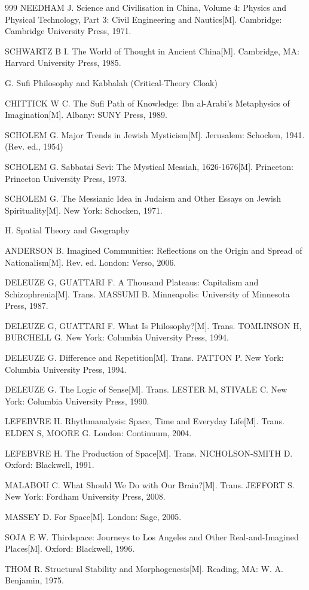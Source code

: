 \begin{thebibliography}{999}
\bibitem{} NEEDHAM J. Science and Civilisation in China, Volume 4: Physics and Physical Technology, Part 3: Civil Engineering and Nautics[M]. Cambridge: Cambridge University Press, 1971.

\bibitem{} SCHWARTZ B I. The World of Thought in Ancient China[M]. Cambridge, MA: Harvard University Press, 1985.

\bibitem{} G. Sufi Philosophy and Kabbalah (Critical-Theory Cloak)

\bibitem{} CHITTICK W C. The Sufi Path of Knowledge: Ibn al-Arabi’s Metaphysics of Imagination[M]. Albany: SUNY Press, 1989.

\bibitem{} SCHOLEM G. Major Trends in Jewish Mysticism[M]. Jerusalem: Schocken, 1941. (Rev. ed., 1954)

\bibitem{} SCHOLEM G. Sabbatai Sevi: The Mystical Messiah, 1626-1676[M]. Princeton: Princeton University Press, 1973.

\bibitem{} SCHOLEM G. The Messianic Idea in Judaism and Other Essays on Jewish Spirituality[M]. New York: Schocken, 1971.

\bibitem{} H. Spatial Theory and Geography

\bibitem{} ANDERSON B. Imagined Communities: Reflections on the Origin and Spread of Nationalism[M]. Rev. ed. London: Verso, 2006.

\bibitem{} DELEUZE G, GUATTARI F. A Thousand Plateaus: Capitalism and Schizophrenia[M]. Trans. MASSUMI B. Minneapolis: University of Minnesota Press, 1987.

\bibitem{} DELEUZE G, GUATTARI F. What Is Philosophy?[M]. Trans. TOMLINSON H, BURCHELL G. New York: Columbia University Press, 1994.

\bibitem{} DELEUZE G. Difference and Repetition[M]. Trans. PATTON P. New York: Columbia University Press, 1994.

\bibitem{} DELEUZE G. The Logic of Sense[M]. Trans. LESTER M, STIVALE C. New York: Columbia University Press, 1990.

\bibitem{} LEFEBVRE H. Rhythmanalysis: Space, Time and Everyday Life[M]. Trans. ELDEN S, MOORE G. London: Continuum, 2004.

\bibitem{} LEFEBVRE H. The Production of Space[M]. Trans. NICHOLSON-SMITH D. Oxford: Blackwell, 1991.

\bibitem{} MALABOU C. What Should We Do with Our Brain?[M]. Trans. JEFFORT S. New York: Fordham University Press, 2008.

\bibitem{} MASSEY D. For Space[M]. London: Sage, 2005.

\bibitem{} SOJA E W. Thirdspace: Journeys to Los Angeles and Other Real-and-Imagined Places[M]. Oxford: Blackwell, 1996.

\bibitem{} THOM R. Structural Stability and Morphogenesis[M]. Reading, MA: W. A. Benjamin, 1975.

\end{thebibliography}